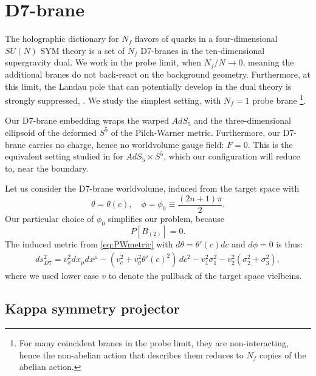 \section{D7-brane}\label{sec:D7brane}

The holographic dictionary for $N_f$ flavors of quarks in a four-dimensional $SU(N)$ SYM theory is a set of $N_f$ D7-branes in the ten-dimensional supergravity dual. We work in the probe limit, when $N_f/N \rightarrow 0$, meaning the additional branes do not back-react on the background geometry. Furthermore, at this limit, the Landau pole that can potentially develop in the dual theory is strongly suppressed, \cite{CasalderreySolana:2011us}. We study the simplest setting, with $N_f=1$ probe brane \footnote{For many coincident branes in the probe limit, they are non-interacting, hence the non-abelian action that describes them reduces to $N_f$ copies of the abelian action.}.

Our D7-brane embedding wraps the warped $AdS_5$ and the three-dimensional ellipsoid of the deformed $S^5$ of the Pilch-Warner metric. Furthermore, our D7-brane carries no charge, hence no worldvolume gauge field: $F = 0$. This is the equivalent setting studied in \cite{Karch:2002sh} for $AdS_5 \times S^5$, which our configuration will reduce to, near the boundary.


Let us consider the D7-brane worldvolume, induced from the target space with 
\begin{equation}\label{eq:ansatz}
 \theta = \theta(c), \quad \phi=\phi_0\equiv\frac{(2 n + 1)\pi}{2}.
\end{equation}
Our particular choice of $\phi_0$ simplifies our problem, because
\begin{equation}
 P[B_{(2)}] = 0.
\end{equation}
The induced metric from \eqref{eq:PWmetric} with $d\theta = \theta'(c) dc$ and $d\phi=0$ is thus:
\begin{align}\label{eq:D7metric}
ds_{D7}^2 =
v_x^2 dx_\mu dx^\mu 
- (v_c^2 +v_\theta^2 \theta'(c)^2)\, dc^2 - v_1^2 \sigma_1^2 - v_2^2 (\sigma_2^2 + \sigma_3^2),
\end{align}
where we used lower case $v$ to denote the pullback of the target space vielbeins.



\subsection{Kappa symmetry projector}


